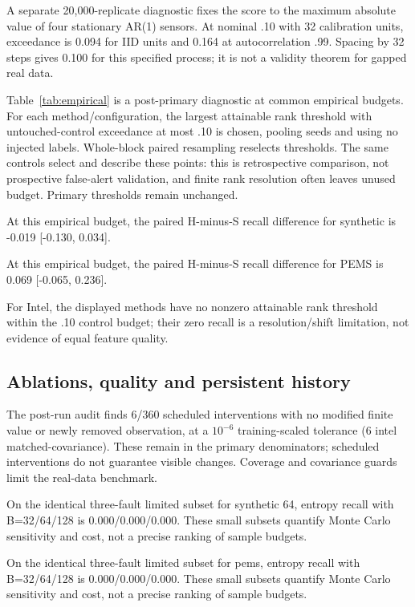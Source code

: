 A separate 20,000-replicate diagnostic fixes the score to the maximum absolute value of four stationary AR(1) sensors. At nominal .10 with 32 calibration units, exceedance is 0.094 for IID units and 0.164 at autocorrelation .99. Spacing by 32 steps gives 0.100 for this specified process; it is not a validity theorem for gapped real data.



Table~\ref{tab:empirical} is a post-primary diagnostic at common empirical budgets. For each method/configuration, the largest attainable rank threshold with untouched-control exceedance at most .10 is chosen, pooling seeds and using no injected labels. Whole-block paired resampling reselects thresholds. The same controls select and describe these points: this is retrospective comparison, not prospective false-alert validation, and finite rank resolution often leaves unused budget. Primary thresholds remain unchanged.

At this empirical budget, the paired H-minus-S recall difference for synthetic is -0.019 [-0.130, 0.034].

At this empirical budget, the paired H-minus-S recall difference for PEMS is 0.069 [-0.065, 0.236].

For Intel, the displayed methods have no nonzero attainable rank threshold within the .10 control budget; their zero recall is a resolution/shift limitation, not evidence of equal feature quality.

\subsection{Ablations, quality and persistent history}



The post-run audit finds 6/360 scheduled interventions with no modified finite value or newly removed observation, at a $10^{-6}$ training-scaled tolerance (6 intel matched-covariance). These remain in the primary denominators; scheduled interventions do not guarantee visible changes. Coverage and covariance guards limit the real-data benchmark.

On the identical three-fault limited subset for synthetic 64, entropy recall with B=32/64/128 is 0.000/0.000/0.000. These small subsets quantify Monte Carlo sensitivity and cost, not a precise ranking of sample budgets.

On the identical three-fault limited subset for pems, entropy recall with B=32/64/128 is 0.000/0.000/0.000. These small subsets quantify Monte Carlo sensitivity and cost, not a precise ranking of sample budgets.

